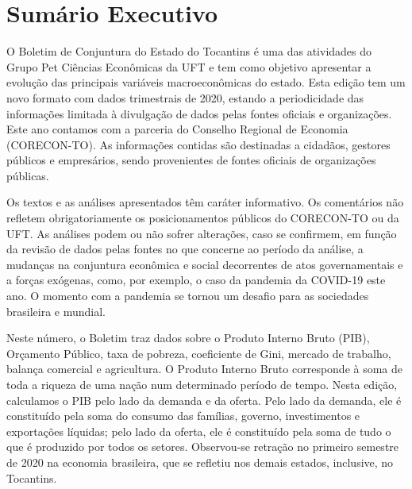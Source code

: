 \chapter*{Sumário Executivo}
\begin{center}
	\parbox{0.7\linewidth}{
		\par O Boletim de Conjuntura do Estado do Tocantins é uma das atividades do Grupo Pet Ciências Econômicas da UFT e tem como objetivo apresentar a evolução das principais variáveis macroeconômicas do estado. Esta edição tem um novo formato com dados trimestrais de 2020, estando a periodicidade das informações   limitada à divulgação de dados pelas fontes oficiais e organizações. Este ano contamos com a parceria do Conselho Regional de Economia (CORECON-TO). As informações contidas são destinadas a cidadãos, gestores públicos e empresários, sendo provenientes de fontes oficiais de organizações públicas.

		\par Os textos e as análises apresentados têm caráter   informativo. Os comentários não refletem obrigatoriamente os posicionamentos públicos do CORECON-TO ou da UFT. As análises podem ou não sofrer alterações, caso se confirmem, em função da revisão de dados pelas fontes no que concerne ao   período da análise, a mudanças na conjuntura econômica e social decorrentes de atos governamentais e a forças exógenas, como, por exemplo, o caso da pandemia da COVID-19 este ano. O momento com a pandemia se tornou um desafio para as sociedades brasileira e   mundial.

		\par Neste número, o Boletim traz dados sobre o Produto Interno Bruto (PIB), Orçamento Público, taxa de pobreza, coeficiente de Gini, mercado de trabalho, balança comercial e agricultura. O Produto Interno Bruto corresponde à soma de toda a riqueza de uma nação num determinado período de tempo. Nesta edição, calculamos o PIB pelo lado da demanda e da oferta. Pelo lado da demanda, ele é constituído pela soma do consumo das famílias, governo, investimentos e exportações líquidas; pelo lado da oferta, ele é constituído pela    soma de tudo o que é produzido por todos os setores. Observou-se   retração no primeiro semestre de 2020 na economia brasileira, que se refletiu nos demais estados, inclusive, no Tocantins.

}
\end{center}
